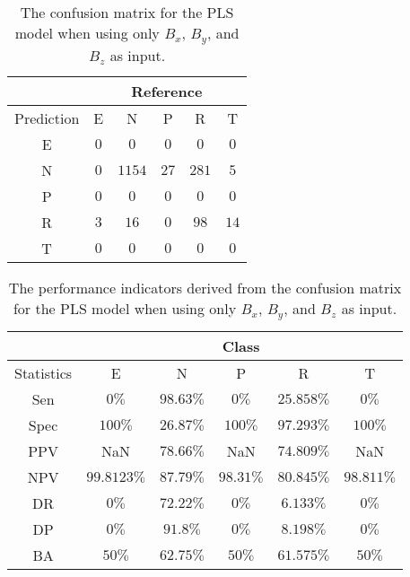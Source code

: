 \begin{table}[!ht]
	\centering
	\begin{tabular}{|c|c|c|c|c|c|}
		\hline
		 & \multicolumn{5}{|c|}{Reference} \\ \hline
		 Prediction & E & N & P & R & T \\ \hline
		 E & $0$ & $0$ & $0$ & $0$ & $0$ \\ \hline
		 N & $0$ & $1154$ & $27$ & $281$ & $5$ \\ \hline
		 P & $0$ & $0$ & $0$ & $0$ & $0$ \\ \hline
		 R & $3$ & $16$ & $0$ & $98$ & $14$ \\ \hline
		 T & $0$ & $0$ & $0$ & $0$ & $0$ \\ \hline
	\end{tabular}
	\caption{The confusion matrix for the PLS model when using only $B_{x}$, $B_{y}$, and $B_{z}$ as input.}
	\label{tab:cm:coord:pls}
\end{table}

\begin{table}[!ht]
	\centering
	\begin{tabular}{|c|c|c|c|c|c|}
		\hline
		 & \multicolumn{5}{c|}{Class} \\ \hline
		Statistics & E & N & P & R & T \\ \hline
		Sen & $0\%$ & $98.63\%$ & $0\%$ & $25.858\%$ & $0\%$ \\ \hline
		Spec & $100\%$ & $26.87\%$ & $100\%$ & $97.293\%$ & $100\%$ \\ \hline
		PPV & NaN & $78.66\%$ & NaN & $74.809\%$ & NaN \\ \hline
		NPV & $99.8123\%$ & $87.79\%$ & $98.31\%$ & $80.845\%$ & $98.811\%$ \\ \hline
		DR & $0\%$ & $72.22\%$ & $0\%$ & $6.133\%$ & $0\%$ \\ \hline
		DP & $0\%$ & $91.8\%$ & $0\%$ & $8.198\%$ & $0\%$ \\ \hline
		BA & $50\%$ & $62.75\%$ & $50\%$ & $61.575\%$ & $50\%$ \\ \hline
	\end{tabular}
	\caption{The performance indicators derived from the confusion matrix for the PLS model when using only $B_{x}$, $B_{y}$, and $B_{z}$ as input.}
	\label{tab:cs:reverse:coord:pls}
\end{table}

